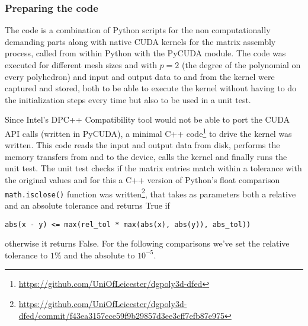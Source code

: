 \documentclass[../main]{subfiles}
\begin{document}
\subsubsection{Preparing the code}\label{sec:dgpoly3d_prep}
The code is a combination of Python scripts for the non computationally demanding parts along with native CUDA kernels for the matrix assembly process, called from within Python with the PyCUDA module.
The code was executed for different mesh sizes and with $p=2$ (the degree of the polynomial on every polyhedron) and input and output data to and from the kernel were captured and stored, both to be able to execute the kernel without having to do the initialization steps every time but also to be used in a unit test.

Since Intel's DPC++ Compatibility tool would not be able to port the CUDA API calls (written in PyCUDA), a minimal C++ code\footnote{\url{https://github.com/UniOfLeicester/dgpoly3d-dfed}} to drive the kernel was written.
This code reads the input and output data from disk, performs the memory transfers from and to the device, calls the kernel and finally runs the unit test.
The unit test checks if the matrix entries match within a tolerance with the original values and for this a C++ version of Python's float comparison \texttt{math.isclose()} function was written\footnote{\url{https://github.com/UniOfLeicester/dgpoly3d-dfed/commit/f43ea3157ece59f9b29857d3ee3cff7efb87e975}}, that takes as parameters both a relative and an absolute tolerance and returns True if
\begin{verbatim}
abs(x - y) <= max(rel_tol * max(abs(x), abs(y)), abs_tol))
\end{verbatim}
otherwise it returns False.
For the following comparisons we've set the relative tolerance to $1\%$ and the absolute to $10^{-5}$.
\end{document}
